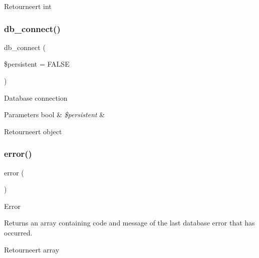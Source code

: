 \begin{DoxyReturn}{Retourneert}
int 
\end{DoxyReturn}
\mbox{\label{class_c_i___d_b__pdo__driver_a52bf595e79e96cc0a7c907a9b45aeb4d}} 
\subsubsection{\texorpdfstring{db\_connect()}{db\_connect()}}
{\footnotesize\ttfamily db\+\_\+connect (\begin{DoxyParamCaption}\item[{}]{\$persistent = {\ttfamily FALSE} }\end{DoxyParamCaption})}

Database connection


\begin{DoxyParams}[1]{Parameters}
bool & {\em \$persistent} & \\
\hline
\end{DoxyParams}
\begin{DoxyReturn}{Retourneert}
object 
\end{DoxyReturn}
\mbox{\label{class_c_i___d_b__pdo__driver_a43b8d30b879d4f09ceb059b02af2bc02}} 
\subsubsection{\texorpdfstring{error()}{error()}}
{\footnotesize\ttfamily error (\begin{DoxyParamCaption}{ }\end{DoxyParamCaption})}

Error

Returns an array containing code and message of the last database error that has occurred.

\begin{DoxyReturn}{Retourneert}
array 
\end{DoxyReturn}
\mbox{\label{class_c_i___d_b__pdo__driver_ae61dc2c85e5516f143f6246c686bc3fc}} 
